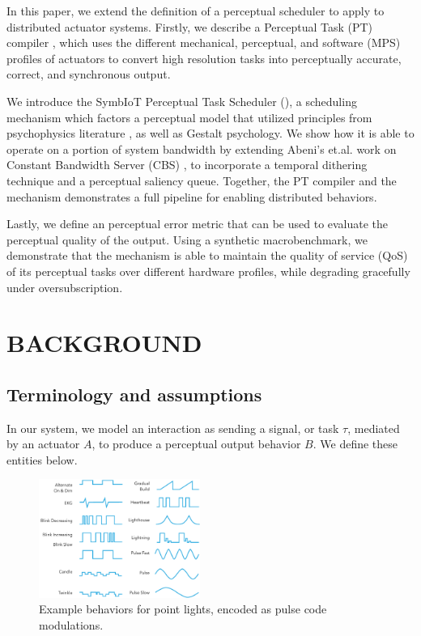 \documentclass{sigchi}
\newcommand{\expresso}{SymbIoT }
\newcommand*{\schedule}[1]{{\textbf{\small{\fontfamily{cmss}\selectfont{#1}}}}}
\begin{document}
In this paper, we extend the definition of a perceptual scheduler \cite{chaudhary_perceptual_2001} to apply to distributed actuator systems. Firstly, we describe a Perceptual Task (PT) compiler , which uses the different mechanical, perceptual, and software (MPS) profiles of actuators to convert high resolution tasks into perceptually accurate, correct, and synchronous output. 

We introduce the \expresso Perceptual Task Scheduler (\schedule{PTS}), a scheduling mechanism which factors a perceptual model that utilized principles from psychophysics literature \cite{pelli_psychophysical_1995}, as well as Gestalt psychology. We show how it is able to operate on a portion of system bandwidth by extending Abeni's et.al. work on Constant Bandwidth Server (CBS) \cite{abeni_integrating_1998}, to incorporate a temporal dithering technique and a perceptual saliency queue. Together, the PT compiler and the \schedule{PTS} mechanism demonstrates a full pipeline for enabling distributed behaviors. 

Lastly, we define an perceptual error metric that can be used to evaluate the perceptual quality of the output. Using a synthetic macrobenchmark, we demonstrate that the \schedule{PTS} mechanism is able to maintain the quality of service (QoS) of its perceptual tasks over different hardware profiles, while degrading gracefully under oversubscription. 

\section{BACKGROUND}
\lipsum[1] 
  
  \subsection{Terminology and assumptions} \label{sec:terms}
  In our system, we model an interaction as sending a signal, or task $\tau$, mediated by an actuator $A$, to produce a perceptual output behavior $B$. We define these entities below.

  \begin{figure}[t]
      \centering
      \includegraphics[keepaspectratio, width=0.47\textwidth]{figures/behaviors.pdf}
      \caption{ Example behaviors for point lights, encoded as pulse code modulations. }
        \label{fig:behaviors} 
    \end{figure}
\end{document}
